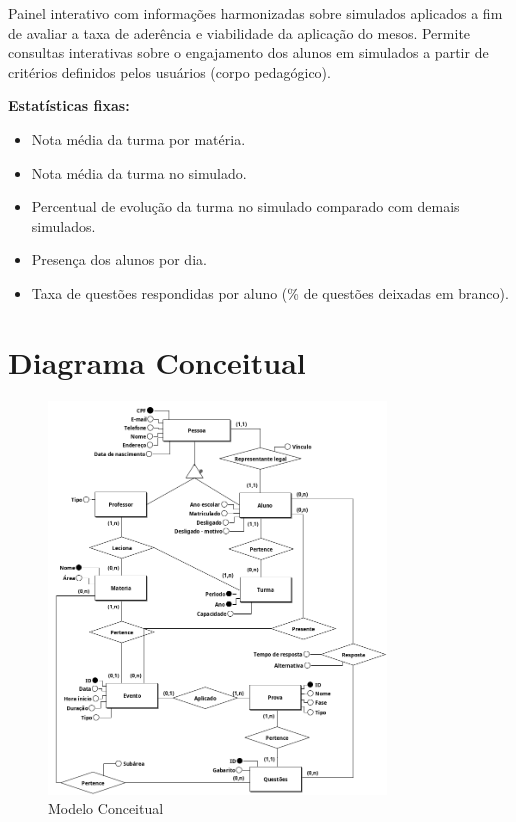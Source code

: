 \documentclass{article}
\begin{document}
Painel interativo com informações harmonizadas sobre simulados aplicados a fim de avaliar a taxa de aderência e viabilidade da aplicação do mesos. Permite consultas interativas sobre o engajamento dos alunos em simulados a partir de critérios definidos pelos usuários (corpo pedagógico).
\vspace{0.5cm}

\textbf{Estatísticas fixas:}
\begin{itemize}
    \item Nota média da turma por matéria.
    \item Nota média da turma no simulado.
    \item Percentual de evolução da turma no simulado comparado com demais simulados.
    \item Presença dos alunos por dia.
    \item Taxa de questões respondidas por aluno (\% de questões deixadas em branco).
\end{itemize}

\section{Diagrama Conceitual}
\begin{figure}[h!]
    \centering
    \includegraphics[width=0.8\textwidth]{Conceitual_1.png} 
    \caption{Modelo Conceitual}
    \label{fig:myimage}
\end{figure}
\end{document}
